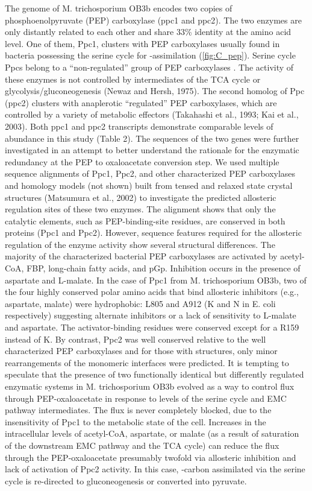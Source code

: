 The genome of M. trichosporium OB3b encodes two copies of phosphoenolpyruvate (PEP) carboxylase (ppc1 and ppc2).
The two enzymes are only distantly related to each other and share 33\% identity at the amino acid level.
One of them, Ppc1, clusters with PEP carboxylases usually found in bacteria possessing the serine cycle for -assimilation (\ref{fig:C_pep}).
Serine cycle Ppcs belong to a “non-regulated” group of PEP carboxylases \cite{anthony1982}.
The activity of these enzymes is not controlled by intermediates of the TCA cycle or glycolysis/gluconeogenesis (Newaz and Hersh, 1975).
The second homolog of Ppc (ppc2) clusters with anaplerotic “regulated” PEP carboxylases, which are controlled by a variety of metabolic effectors (Takahashi et al., 1993; Kai et al., 2003).
Both ppc1 and ppc2 transcripts demonstrate comparable levels of abundance in this study (Table 2).
The sequences of the two genes were further investigated in an attempt to better understand the rationale for the enzymatic redundancy at the PEP to oxaloacetate conversion step.
We used multiple sequence alignments of Ppc1, Ppc2, and other characterized PEP carboxylases and homology models (not shown) built from tensed and relaxed state crystal structures (Matsumura et al., 2002) to investigate the predicted allosteric regulation sites of these two enzymes.
The alignment shows that only the catalytic elements, such as PEP-binding-site residues, are conserved in both proteins (Ppc1 and Ppc2). %
However, sequence features required for the allosteric regulation of the enzyme activity show several structural differences.
The majority of the characterized bacterial PEP carboxylases are activated by acetyl-CoA, FBP, long-chain fatty acids, and pGp.
Inhibition occurs in the presence of aspartate and L-malate.
In the case of Ppc1 from M. trichosporium OB3b, two of the four highly conserved polar amino acids that bind allosteric inhibitors (e.g., aspartate, malate) were hydrophobic: L805 and A912 (K and N in E. coli respectively) suggesting alternate inhibitors or a lack of sensitivity to L-malate and aspartate.
The activator-binding residues were conserved except for a R159 instead of K.
By contrast, Ppc2 was well conserved relative to the well characterized PEP carboxylases and for those with structures, only minor rearrangements of the monomeric interfaces were predicted.
It is tempting to speculate that the presence of two functionally identical but differently regulated enzymatic systems in M. trichosporium OB3b evolved as a way to control flux through PEP-oxaloacetate in response to levels of the serine cycle and EMC pathway intermediates.
The flux is never completely blocked, due to the insensitivity of Ppc1 to the metabolic state of the cell.
Increases in the intracellular levels of acetyl-CoA, aspartate, or malate (as a result of saturation of the downstream EMC pathway and the TCA cycle) can reduce the flux through the PEP-oxaloacetate presumably twofold via allosteric inhibition and lack of activation of Ppc2 activity.
In this case, -carbon assimilated via the serine cycle is re-directed to gluconeogenesis or converted into pyruvate.

